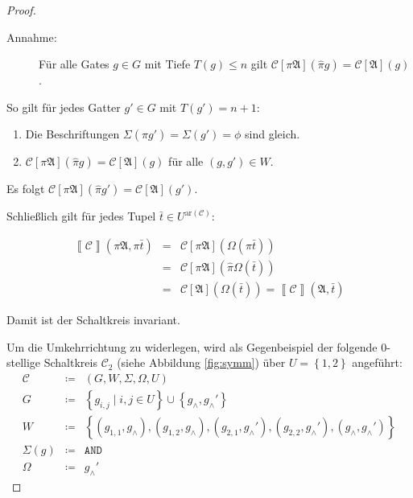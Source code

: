 \begin{proof}
\begin{description}
\begin{description}
\item [{Annahme:}] Für alle Gates $g\in G$ mit Tiefe $T\left(g\right)\leqslant n$
gilt $\mathcal{C}\left[\pi\mathfrak{A}\right]\left(\hat{\pi}g\right)=\mathcal{C}\left[\mathfrak{A}\right]\left(g\right)$.
\end{description}
So gilt für jedes Gatter $g'\in G$ mit $T\left(g'\right)=n+1$: 
\begin{enumerate}
\item Die Beschriftungen $\Sigma\left(\hat{\pi}g'\right)=\Sigma\left(g'\right)=\phi$
sind gleich.
\item $\mathcal{C}\left[\pi\mathfrak{A}\right]\left(\hat{\pi}g\right)=\mathcal{C}\left[\mathfrak{A}\right]\left(g\right)$
für alle $\left(g,g'\right)\in W$.
\end{enumerate}
Es folgt $\mathcal{C}\left[\pi\mathfrak{A}\right]\left(\hat{\pi}g'\right)=\mathcal{C}\left[\mathfrak{A}\right]\left(g'\right)$.

\end{description}
Schließlich gilt für jedes Tupel $\bar{t}\in U^{\mathrm{ar}\left(\mathcal{C}\right)}$:

\begin{eqnarray*}
\left\llbracket \mathcal{C}\right\rrbracket \left(\pi\mathfrak{A},\pi\bar{t}\right) & = & \mathcal{C}\left[\pi\mathfrak{A}\right]\left(\Omega\left(\pi\bar{t}\right)\right)\\
 & = & \mathcal{C}\left[\pi\mathfrak{A}\right]\left(\hat{\pi}\Omega\left(\bar{t}\right)\right)\\
 & = & \mathcal{C}\left[\mathfrak{A}\right]\left(\Omega\left(\bar{t}\right)\right)=\left\llbracket \mathcal{C}\right\rrbracket \left(\mathfrak{A},\bar{t}\right)
\end{eqnarray*}

Damit ist der Schaltkreis invariant.

Um die Umkehrrichtung zu widerlegen, wird als Gegenbeispiel der folgende
$0$-stellige Schaltkreis $\mathcal{C}_{2}$ (siehe Abbildung \ref{fig:symm})
über $U=\left\{ 1,2\right\} $ angeführt:
\begin{eqnarray*}
\mathcal{C} & \coloneqq & \left(G,W,\Sigma,\Omega,U\right)\\
G & \coloneqq & \left\{ g_{i,j}\mid i,j\in U\right\} \cup\left\{ g_{\wedge},g_{\wedge}'\right\} \\
W & \coloneqq & \left\{ \left(g_{1,1},g_{\wedge}\right),\left(g_{1,2},g_{\wedge}\right),\left(g_{2,1},g_{\wedge}'\right),\left(g_{2,2},g_{\wedge}'\right),\left(g_{\wedge},g_{\wedge}'\right)\right\} \\
\Sigma\left(g\right) & \coloneqq & \mathtt{AND}\\
\Omega & \coloneqq & g_{\wedge}'
\end{eqnarray*}


\end{proof}
